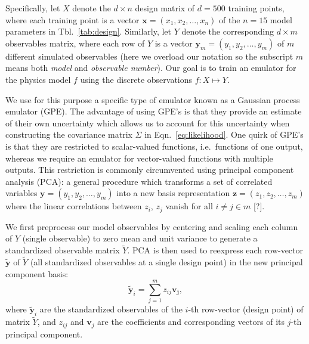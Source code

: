\documentclass[aps,prc,reprint,amsmath,nofootinbib]{revtex4-1}
\newcommand{\x}{\mathbf{x}}
\newcommand{\y}{\mathbf{y}}
\newcommand{\z}{\mathbf{z}}
\newcommand{\note}{\textcolor{theblue}{[?]}}
\begin{document}
Specifically, let $X$ denote the ${d \times n}$ design matrix of $d=500$ training points, where each training point is a vector $\x = (x_1, x_2, \dots, x_n)$ of the $n=15$ model parameters in Tbl.~\ref{tab:design}.
Similarly, let $Y$ denote the corresponding ${d \times m}$ observables matrix, where each row of $Y$ is a vector $\y_m = (y_1, y_2, \dots, y_m)$ of $m$ different simulated observables (here we overload our notation so the subscript $m$ means both \emph{model} and \emph{observable number}).
Our goal is to train an emulator for the physics model $f$ using the discrete observations $f: X \mapsto Y$.

We use for this purpose a specific type of emulator known as a Gaussian process emulator (GPE).
The advantage of using GPE's is that they provide an estimate of their own uncertainty which allows us to account for this uncertainty when constructing the covariance matrix $\Sigma$ in Eqn.~\eqref{eq:likelihood}.
One quirk of GPE's is that they are restricted to scalar-valued functions, i.e.\ functions of one output, whereas we require an emulator for vector-valued functions with multiple outputs.
This restriction is commonly circumvented using principal component analysis (PCA): a general procedure which transforms a set of correlated variables $\y = (y_1, y_2, \dots, y_m)$ into a new basis representation $\z = (z_1, z_2, \dots, z_m)$ where the linear correlations between $z_i$, $z_j$ vanish for all $i\ne j \in m$ \note.

We first preprocess our model observables by centering and scaling each column of $Y$ (single observable) to zero mean and unit variance to generate a standardized observable matrix $\tilde{Y}$.
PCA is then used to reexpress each row-vector $\tilde{\y}$ of $\tilde{Y}$ (all standardized observables at a single design point) in the new principal component basis:
\begin{equation}
  \tilde{\y}_i = \sum\limits_{j=1}^m z_{ij} \mathbf{v_j},
\end{equation}
where $\tilde{\y}_i$ are the standardized observables of the $i$-th row-vector (design point) of matrix $\tilde{Y}$, and $z_{ij}$ and $\mathbf{v}_j$ are the coefficients and corresponding vectors of its $j$-th principal component.
\end{document}
